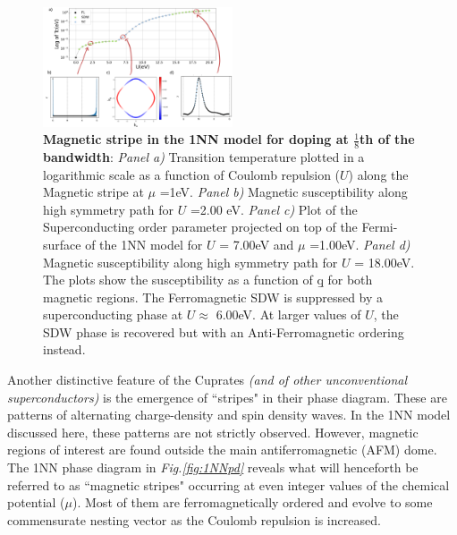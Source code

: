 \documentclass[11pt]{article}
\begin{document}
\begin{figure}[htbp]  %
    \centering
    \includegraphics[width=0.5\textwidth]{1NNstripes.png}  %
    \caption{\textbf{Magnetic stripe in the 1NN model for doping at $\frac{1}{8}$th of the bandwidth}: \textit{Panel a)} Transition temperature plotted in a logarithmic scale as a function of Coulomb repulsion ($U$) along the Magnetic stripe at $\mu$ =1eV. 
       \textit{Panel b)} Magnetic susceptibility along high symmetry path for $U$ =2.00 eV. 
       \textit{Panel c)} Plot of the Superconducting order parameter projected on top of the Fermi-surface of the 1NN model for $U$ = 7.00eV and $\mu$ =1.00eV.
       \textit{Panel d)} Magnetic susceptibility along high symmetry path for $U$ = 18.00eV. The plots show the susceptibility as a function of \b{q} for both magnetic regions. The Ferromagnetic SDW is suppressed by a superconducting phase at $U$$\approx$ 6.00eV. At larger values of $U$,  the SDW phase is recovered but with an Anti-Ferromagnetic ordering instead.  }
    \label{fig:1NN_stripes}
\end{figure}


\noindent Another distinctive feature of the Cuprates \textit{(and of other unconventional superconductors}\cite{levi1998stripes}\textit{)} is 
the emergence of ``stripes" in their phase diagram. These are patterns of alternating
charge-density and spin density waves\cite{zachar1998landau, vojta2009lattice}. 
In the 1NN model discussed here, these patterns are not strictly observed. However, magnetic regions of 
interest are found outside the main antiferromagnetic (AFM) dome. 
The 1NN phase diagram in \textit{Fig.\ref{fig:1NNpd}} reveals what will henceforth be referred to as ``magnetic stripes" 
occurring at even integer values of the chemical potential ($\mu$). Most of them are ferromagnetically ordered and evolve to some commensurate 
nesting vector as the Coulomb repulsion is increased. \par
\medskip
\end{document}
